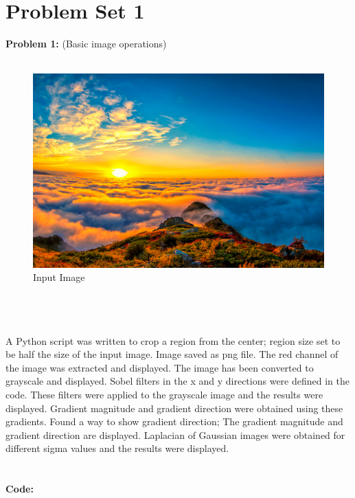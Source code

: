 \documentclass[a4paper, 12pt]{report}
\begin{document}
\section*{{\textbf{Problem Set 1}}}
\textbf{Problem 1:} (Basic image operations)
\\ \\
\begin{figure}[h]
\includegraphics[scale=.39]{huser.jpeg}
\centering
\caption{Input Image}
\end{figure}
\\ \\ \\
A Python script was written to crop a region from the center; region size set to be half the size of the input image. Image saved as png file. The red channel of the image was extracted and displayed. The image has been converted to grayscale and displayed. Sobel filters in the x and y directions were defined in the code. These filters were applied to the grayscale image and the results were displayed. Gradient magnitude and gradient direction were obtained using these gradients. Found a way to show gradient direction; The gradient magnitude and gradient direction are displayed. Laplacian of Gaussian images were obtained for different sigma values and the results were displayed. \\ \\ \\
\textbf{Code:}


\end{document}
